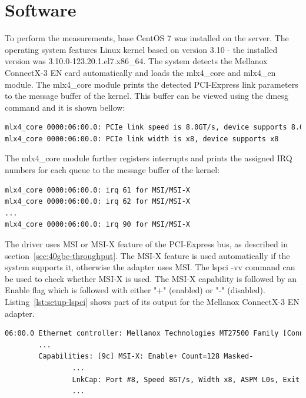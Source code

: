 
\section{Software}

To perform the measurements, base CentOS 7 was installed on the server.
The operating system features Linux kernel based on version 3.10 -
the installed version was 3.10.0-123.20.1.el7.x86\_64.
The system detects the Mellanox ConnectX-3 EN card automatically and loads the mlx4\_core and mlx4\_en module.
The mlx4\_core module prints the detected PCI-Express link parameters to the message buffer of the kernel.
This buffer can be viewed using the dmesg command and it is shown bellow:
\begin{lstlisting}[language=TeX]
mlx4_core 0000:06:00.0: PCIe link speed is 8.0GT/s, device supports 8.0GT/s
mlx4_core 0000:06:00.0: PCIe link width is x8, device supports x8
\end{lstlisting}
The mlx4\_core module further registers interrupts and prints the assigned IRQ numbers for each queue
to the message buffer of the kernel:
\begin{lstlisting}[language=TeX]
mlx4_core 0000:06:00.0: irq 61 for MSI/MSI-X
mlx4_core 0000:06:00.0: irq 62 for MSI/MSI-X
...
mlx4_core 0000:06:00.0: irq 90 for MSI/MSI-X
\end{lstlisting}

The driver uses MSI or MSI-X feature of the PCI-Express bus, as described in section~\ref{sec:40gbe-throughput}.
The MSI-X feature is used automatically if the system supports it, otherwise the adapter uses MSI.
The lspci -vv command can be used to check whether MSI-X is used.
The MSI-X capability is followed by an Enable flag which is followed with either "+" (enabled)
or "-" (disabled).
Listing~\ref{lst:setup-lspci} shows part of its output for the Mellanox ConnectX-3 EN adapter.
\begin{lstlisting}[language=TeX,label={lst:setup-lspci},caption={Partial output of lspci -vv for Mellanox ConnectX-3 EN}]
06:00.0 Ethernet controller: Mellanox Technologies MT27500 Family [ConnectX-3]
		...
		Capabilities: [9c] MSI-X: Enable+ Count=128 Masked-
				...
				LnkCap: Port #8, Speed 8GT/s, Width x8, ASPM L0s, Exit Latency L0s unlimited, L1 unlimited
				...
\end{lstlisting}



